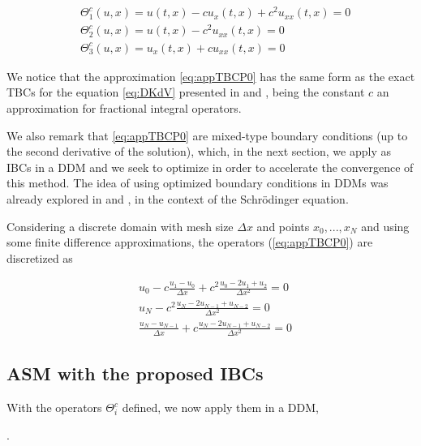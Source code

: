 \begin{align}
  \label{eq:appTBCP0}
        &\Theta_1^{c}(u,x) = u(t,x) - c u_x(t,x)  + c^2  u_{xx}(t,x) = 0 \\
        &\Theta_2^{c}(u,x) =  u(t,x) - c^2    u_{xx}(t,x) = 0\\
        &\Theta_3^{c} (u,x)= u_x(t,x) + c u_{xx}(t,x)  = 0
\end{align}

\indent We notice that the approximation \eqref{eq:appTBCP0} has the same form as the exact TBCs for the equation \eqref{eq:DKdV} presented in \cite{zheng2008} and \cite{besse2015}, being the constant $c$ an approximation for fractional integral operators. 

\indent We also remark that \eqref{eq:appTBCP0} are mixed-type boundary conditions (up to the second derivative of the solution), which, in the next section, we apply as IBCs in a DDM and we seek to optimize in order to accelerate the convergence of this method. The idea of using optimized boundary conditions in DDMs was already explored in \cite{Halpern2008} and \cite{besse2017}, in the context of the Schrödinger equation.

\indent Considering a discrete domain with mesh size $\Delta x$ and points $x_0, ..., x_N$ and using some finite difference approximations, the operators (\ref{eq:appTBCP0}) are discretized as

\begin{align}
\label{eq:appDiscTBCP0}
        &u_0 - c \frac{u_1 - u_0}{\Delta x}  + c^2  \frac{u_0 -2u_1 + u_2}{\Delta x^2} = 0 \\
        &u_N - c^2    \frac{u_N -2u_{N-1} + u_{N-2}}{\Delta x^2} = 0 \\
        &\frac{u_N - u_{N-1}}{\Delta x}  + c    \frac{u_N -2u_{N-1} + u_{N-2}}{\Delta x^2} = 0 
\end{align}



\subsection{ASM with the proposed IBCs }

\indent With the operators $\Theta_i^c$ defined, we now apply them in a DDM, 

\indent {}.

